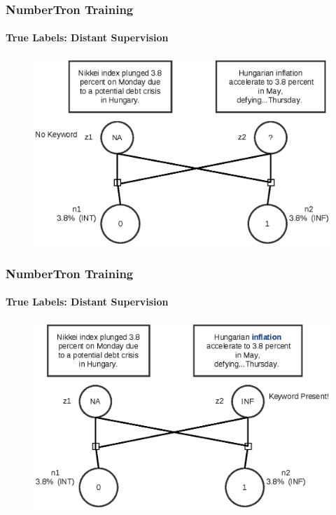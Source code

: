 \documentclass{beamer}
\begin{document}
\begin{frame}
\frametitle{NumberTron Training}
\framesubtitle{True Labels: Distant Supervision}
\begin{figure}
\includegraphics[width=\textwidth, height=0.8\textheight]{images/truelabel13.eps}
\end{figure}
\end{frame}


\begin{frame}
\frametitle{NumberTron Training}
\framesubtitle{True Labels: Distant Supervision}
\begin{figure}
\includegraphics[width=\textwidth, height=0.8\textheight]{images/truelabel14.eps}
\end{figure}
\end{frame}
\end{document}
